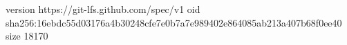 version https://git-lfs.github.com/spec/v1
oid sha256:16ebdc55d03176a4b30248cfe7e0b7a7e989402e864085ab213a407b68f0ee40
size 18170
